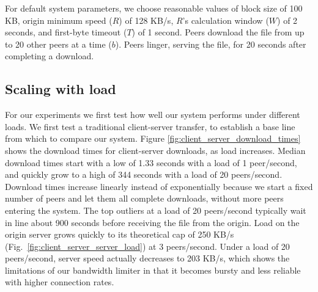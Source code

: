 For default system parameters, we choose reasonable values 
of block size of 100 KB, origin minimum speed ($R$) of 128 KB/s, $R$'s calculation window ($W$) 
of 2 seconds, and first-byte timeout ($T$) of 1 second.  Peers download the file from up to 20 other peers at a time ($b$).
Peers linger, serving the file, for 20 seconds after completing a download.

\subsection{Scaling with load}

For our experiments we first test how well our system performs under different loads.
We first test a traditional client-server transfer, to establish a base line from which to compare 
our system. Figure \ref{fig:client_server_download_times} shows the download times for client-server 
downloads, as load increases.  Median download times start with a low of 1.33 seconds with a load of 1 peer/second,
and quickly grow to a high of 344 seconds with a load of 20 peers/second. Download times increase linearly instead 
of exponentially because we start a fixed number of peers and let them all complete downloads, without more peers
entering the system. 
The top outliers at a load of 20 peers/second typically wait in line about 900 seconds before 
receiving the file from the origin. Load on the origin server grows quickly to its 
theoretical cap of 250 KB/s (Fig.~\ref{fig:client_server_server_load}) 
at 3 peers/second. Under a load of 20 peers/second, server speed actually decreases to 203 KB/s, which 
shows the limitations of our bandwidth limiter in that it becomes bursty and less reliable with higher connection rates. 

